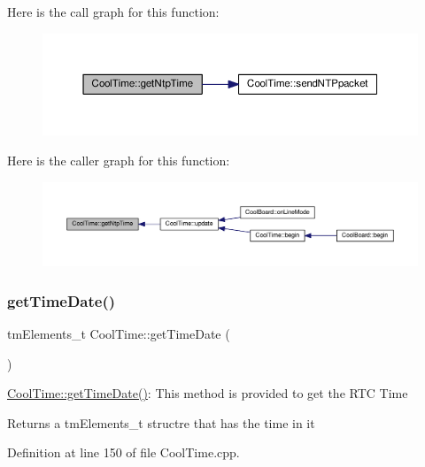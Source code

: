 Here is the call graph for this function\+:\nopagebreak
\begin{figure}[H]
\begin{center}
\leavevmode
\includegraphics[width=350pt]{classCoolTime_a41fbbbfd651c2079f54d4b2911e4c705_cgraph}
\end{center}
\end{figure}
Here is the caller graph for this function\+:\nopagebreak
\begin{figure}[H]
\begin{center}
\leavevmode
\includegraphics[width=350pt]{classCoolTime_a41fbbbfd651c2079f54d4b2911e4c705_icgraph}
\end{center}
\end{figure}
\mbox{\label{classCoolTime_a7a7501c5ca77dd1248bea704c44f986c}} 
\subsubsection{\texorpdfstring{get\+Time\+Date()}{getTimeDate()}}
{\footnotesize\ttfamily tm\+Elements\+\_\+t Cool\+Time\+::get\+Time\+Date (\begin{DoxyParamCaption}{ }\end{DoxyParamCaption})}

\hyperlink{classCoolTime_a7a7501c5ca77dd1248bea704c44f986c}{Cool\+Time\+::get\+Time\+Date()}\+: This method is provided to get the R\+TC Time

\begin{DoxyReturn}{Returns}
a tm\+Elements\+\_\+t structre that has the time in it 
\end{DoxyReturn}


Definition at line 150 of file Cool\+Time.\+cpp.



